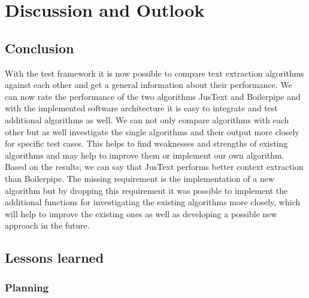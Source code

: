 
\chapter{Discussion and Outlook} %

\label{Discussion and Outlook} %



\section {Conclusion}

With the test framework it is now possible to compare text extraction algorithms against each other and get a general information about their performance. We can now rate the performance of the two algorithms JusText and Boilerpipe and with the implemented software architecture it is easy to integrate and test additional algorithms as well. We can not only compare algorithms with each other but as well investigate the single algorithms and their output more closely for specific test cases. This helps to find weaknesses and strengths of existing algorithms and may help to improve them or implement our own algorithm. Based on the results, we can say that JusText performs better context extraction than Boilerpipe.
The missing requirement is the implementation of a new algorithm but by dropping this requirement it was possible to implement the additional functions for investigating the existing algorithms more closely, which will help to improve the existing ones as well as developing a possible new approach in the future.

\section{Lessons learned}

\subsection{Planning}

